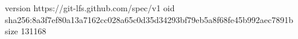 version https://git-lfs.github.com/spec/v1
oid sha256:8a3f7ef80a13a7162cc028a65c0d35d34293bf79eb5a8f68fe45b992aec7891b
size 131168
